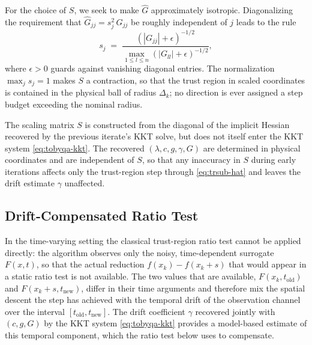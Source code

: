 \documentclass[11pt,a4paper]{article}
\begin{document}
For the choice of $S$, we seek to make $\hat G$ approximately
isotropic. Diagonalizing the requirement that $\hat G_{jj} =
s_j^2\,G_{jj}$ be roughly independent of $j$ leads to the rule
\begin{equation}\label{eq:S-def}
  s_j \;=\;
  \frac{(|G_{jj}| + \epsilon)^{-1/2}}
       {\max_{1\le l\le n}(|G_{ll}| + \epsilon)^{-1/2}},
\end{equation}
where $\epsilon > 0$ guards against vanishing diagonal entries.
The normalization $\max_j s_j = 1$ makes $S$ a contraction, so
that the trust region in scaled coordinates is contained in the
physical ball of radius $\Delta_k$; no direction is ever assigned
a step budget exceeding the nominal radius.

The scaling matrix $S$ is constructed from the diagonal of the
implicit Hessian recovered by the previous iterate's KKT solve,
but does not itself enter the KKT system \eqref{eq:tobyqa-kkt}. The
recovered $(\lambda, c, g, \gamma, G)$ are determined in physical
coordinates and are independent of $S$, so that any inaccuracy in
$S$ during early iterations affects only the trust-region step
through \eqref{eq:trsub-hat} and leaves the drift estimate
$\gamma$ unaffected.

\subsection{Drift-Compensated Ratio Test}
\label{sec:drift-comp}

In the time-varying setting the classical trust-region ratio test
cannot be applied directly: the algorithm observes only the noisy,
time-dependent surrogate $F(x, t)$, so that the actual reduction
$f(x_k) - f(x_k + s)$ that would appear in a static ratio test is
not available. The two values that are available,
$F(x_k, t_{\mathrm{old}})$ and $F(x_k + s, t_{\mathrm{new}})$,
differ in their time arguments and therefore mix the spatial
descent the step has achieved with the temporal drift of the
observation channel over the interval
$[t_{\mathrm{old}}, t_{\mathrm{new}}]$. The drift coefficient
$\gamma$ recovered jointly with $(c, g, G)$ by the KKT system
\eqref{eq:tobyqa-kkt} provides a model-based estimate of this
temporal component, which the ratio test below uses to compensate.
\end{document}
